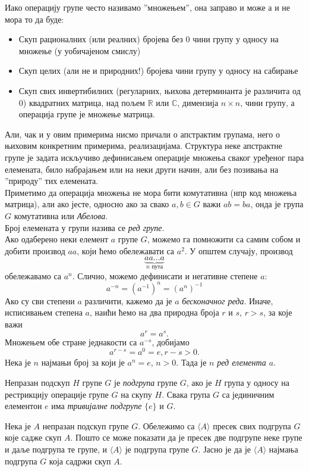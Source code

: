 \documentclass{report}
\theoremstyle{plain}
\theoremstyle{definition}
\begin{document}
Иако операцију групе често називамо ''множењем'', она заправо и може а и не мора то да буде:
\begin{itemize}
  \item Скуп рационалних (или реалних) бројева без $0$ чини групу у односу на множење (у уобичајеном смислу)
  \item Скуп целих (али не и природних!) бројева чини групу у односу на сабирање
  \item Скуп свих инвертибилних (регуларних, њихова детерминанта је различита од $0$) квадратних матрица, над пољем $\mathbb{R}$ или $\mathbb{C}$, димензија $n\times n$, чини групу, а операција групе је множење матрица.
\end{itemize}
Али, чак и у овим примерима нисмо причали о апстрактим групама, него о њиховим конкретним примерима, реализацијама. Структура неке апстрактне групе је задата искључиво дефинисањем операције множења сваког уређеног пара елемената, било набрајањем или на неки други начин, али без позивања на ''природу'' тих елемената.\\
Приметимо да операција множења не мора бити комутативна (нпр код множења матрица), али ако јесте, односно ако за свако $a, b\in G$ важи $ab = ba$, онда је група $G$ комутативна или \emph{Абелова}.\\
Број елемената у групи назива се \emph{ред групе}.\\
Ако одаберено неки елемент $a$ групе $G$, можемо га помножити са самим собом и добити производ $aa$, који ћемо обележавати са $a^2$. У општем случају, производ $$\underbrace{aa...a}_{n\text{ пута}}$$ обележавамо са $a^n$. Слично, можемо дефинисати и негативне степене $a$:
$$a^{-n} = (a^{-1})^n = (a^n)^{-1}$$
Ако су сви степени $a$ различити, кажемо да је $a$ \emph{бесконачног реда}. Иначе, исписивањем степена $a$, наићи ћемо на два природна броја $r$ и $s$, $r>s$, за које важи
$$a^r = a^s.$$
Множењем обе стране једнакости са $a^{-s}$, добијамо
$$a^{r-s} = a^0 = e, r-s>0.$$
Нека је $n$ најмањи број за који је $a^n = e$, $n>0$. Тада је $n$ \emph{ред елемента $a$}.

Непразан подскуп $H$ групе $G$ је \emph{подгрупа} групе $G$, ако је $H$ група у односу на рестрикцију операције групе $G$ на скупу $H$. Свака група $G$ са јединичним елементон $e$ има \emph{тривијалне подгрупе} $\{e\}$ и $G$.

Нека је $A$ непразан подскуп групе $G$. Обележимо са $\langle A\rangle$ пресек свих подгрупа $G$ које садже скуп $A$. Пошто се може показати да је пресек две подгрупе неке групе и даље подгрупа те групе, и $\langle A\rangle$ је подгрупа групе $G$. Јасно је да је $\langle A\rangle$ најмања подгрупа $G$ која садржи скуп $A$.
\end{document}
